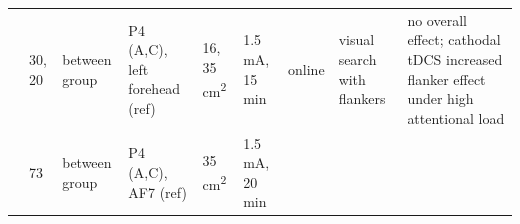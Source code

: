 \documentclass[11pt,english,]{memoir}
\begin{document}
\begin{longtable}[]{@{}lllllllll@{}}
\begin{minipage}[t]{0.08\columnwidth}
\end{minipage} & \begin{minipage}[t]{0.03\columnwidth}\raggedright
30,
20\strut
\end{minipage} & \begin{minipage}[t]{0.05\columnwidth}\raggedright
between
group\strut
\end{minipage} & \begin{minipage}[t]{0.15\columnwidth}\raggedright
P4 (A,C), left forehead (ref)\strut
\end{minipage} & \begin{minipage}[t]{0.04\columnwidth}\raggedright
16,
35
cm\textsuperscript{2}\strut
\end{minipage} & \begin{minipage}[t]{0.06\columnwidth}\raggedright
1.5 mA, 15
min\strut
\end{minipage} & \begin{minipage}[t]{0.05\columnwidth}\raggedright
online\strut
\end{minipage} & \begin{minipage}[t]{0.06\columnwidth}\raggedright
visual
search
with
flankers\strut
\end{minipage} & \begin{minipage}[t]{0.25\columnwidth}\raggedright
no overall effect; cathodal tDCS increased flanker
effect under high attentional load\strut
\end{minipage}\tabularnewline
\begin{minipage}[t]{0.08\columnwidth}\raggedright
\textcite{Kajimura2015}\strut
\end{minipage} & \begin{minipage}[t]{0.03\columnwidth}\raggedright
73\strut
\end{minipage} & \begin{minipage}[t]{0.05\columnwidth}\raggedright
between
group\strut
\end{minipage} & \begin{minipage}[t]{0.15\columnwidth}\raggedright
P4 (A,C), AF7 (ref)\strut
\end{minipage} & \begin{minipage}[t]{0.04\columnwidth}\raggedright
35
cm\textsuperscript{2}\strut
\end{minipage} & \begin{minipage}[t]{0.06\columnwidth}\raggedright
1.5 mA, 20
min\strut
\end{minipage} & \begin{minipage}[t]{0.05\columnwidth}\raggedright

\end{minipage}
\end{longtable}
\end{document}
